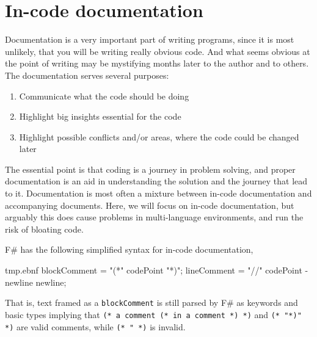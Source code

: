 \chapter{In-code documentation}
\label{chap:documentation}
Documentation is a very important part of writing programs, since it is most unlikely, that you will be writing really obvious code. And what seems obvious at the point of writing may be mystifying months later to the author and to others. The documentation serves several purposes:
\begin{enumerate}
\item Communicate what the code should be doing
\item Highlight big insights essential for the code
\item Highlight possible conflicts and/or areas, where the code could be changed later
\end{enumerate}
The essential point is that coding is a journey in problem solving, and proper documentation is an aid in understanding the solution and the journey that lead to it. Documentation is most often a mixture between in-code documentation and accompanying documents. Here, we will focus on in-code documentation, but arguably this does cause problems in multi-language environments, and run the risk of bloating code.

F\# has the following simplified syntax for in-code documentation,
%
\begin{verbatimwrite}{tmp.ebnf}
blockComment = "(*" {codePoint} "*)";
lineComment = "//" {codePoint - newline} newline;
\end{verbatimwrite}
%
That is, text framed as a \lstinline[language=ebnf]!blockComment! is still parsed by F\# as keywords and basic types implying that \lstinline!(* a comment (* in a comment *) *)! and \lstinline!(* "*)" *)! are valid comments, while \lstinline!(* " *)! is invalid.


